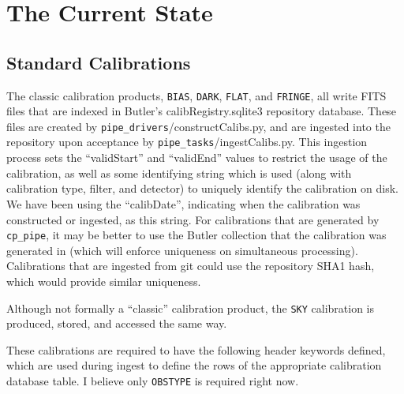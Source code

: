 \documentclass[DM,authoryear,toc]{lsstdoc}
\begin{document}
\section{The Current State}

\subsection{Standard Calibrations}

The classic calibration products, \verb|BIAS|, \verb|DARK|,
\verb|FLAT|, and \verb|FRINGE|, all write FITS files that are indexed
in Butler's calibRegistry.sqlite3 repository database.  These files
are created by \verb|pipe_drivers|/constructCalibs.py, and are
ingested into the repository upon acceptance by
\verb|pipe_tasks|/ingestCalibs.py.  This ingestion process sets the
``validStart'' and ``validEnd'' values to restrict the usage of the
calibration, as well as some identifying string which is used (along
with calibration type, filter, and detector) to uniquely identify the
calibration on disk.  We have been using the ``calibDate'', indicating
when the calibration was constructed or ingested, as this string.  For
calibrations that are generated by \verb|cp_pipe|, it may be better to
use the Butler collection that the calibration was generated in (which
will enforce uniqueness on simultaneous processing).  Calibrations
that are ingested from git could use the repository SHA1 hash, which
would provide similar uniqueness.

Although not formally a ``classic'' calibration product, the \verb|SKY|
calibration is produced, stored, and accessed the same way.

These calibrations are required to have the following header keywords
defined, which are used during ingest to define the rows of the
appropriate calibration database table.  I believe only \verb|OBSTYPE|
is required right now.
\end{document}
